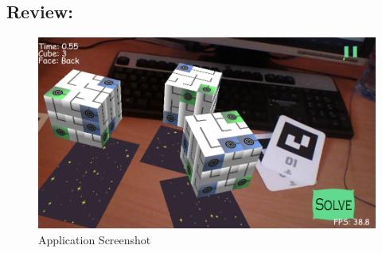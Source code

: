 \subsection{Review:}\label{sc:review}

\begin{figure}[ht!]
	\label{fig:screent shot}
	\centering
	\includegraphics[width=\textwidth]{images/screenshot3.PNG}
	\caption{Application Screenshot}
\end{figure}